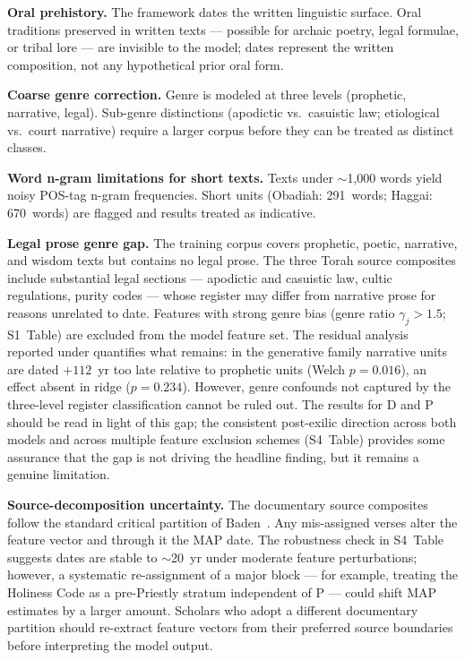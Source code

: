 \documentclass[10pt,letterpaper]{article}
\begin{document}
\textbf{Oral prehistory.}  The framework dates the written linguistic
surface.  Oral traditions preserved in written texts --- possible for
archaic poetry, legal formulae, or tribal lore --- are invisible to the
model; dates represent the written composition, not any hypothetical
prior oral form.

\textbf{Coarse genre correction.}  Genre is modeled at three levels
(prophetic, narrative, legal).  Sub-genre distinctions
(apodictic vs.\ casuistic law; etiological vs.\ court narrative) require
a larger corpus before they can be treated as distinct classes.

\textbf{Word n-gram limitations for short texts.}  Texts under
$\sim$1{,}000 words yield noisy POS-tag n-gram frequencies.  Short units
(Obadiah: 291~words; Haggai: 670~words) are flagged and results treated
as indicative.

\textbf{Legal prose genre gap.}  The training corpus covers prophetic,
poetic, narrative, and wisdom texts but contains no legal prose.  The
three Torah source composites include substantial legal sections ---
apodictic and casuistic law, cultic regulations, purity codes --- whose
register may differ from narrative prose for reasons unrelated to date.
Features with strong genre bias (genre ratio $\gamma_j > 1.5$; S1~Table)
are excluded from the model feature set.  The residual analysis reported
under  quantifies what remains: in the generative
family narrative units are dated $+112$~yr too late relative to prophetic
units (Welch $p = 0.016$), an effect absent in ridge ($p = 0.234$).
However, genre confounds not captured by the three-level register
classification cannot be ruled out.  The results for D and P should be
read in light of this gap; the consistent post-exilic direction across
both models and across multiple feature exclusion schemes (S4~Table)
provides some assurance that the gap is not driving the headline finding,
but it remains a genuine limitation.

\textbf{Source-decomposition uncertainty.}  The documentary source
composites follow the standard critical partition of Baden~\cite{Baden2012}.
Any mis-assigned verses alter the feature vector and through it the MAP
date.  The robustness check in S4~Table suggests dates are stable to
$\sim$20~yr under moderate feature perturbations; however, a systematic
re-assignment of a major block --- for example, treating the Holiness Code
as a pre-Priestly stratum independent of P --- could shift MAP estimates
by a larger amount.  Scholars who adopt a different documentary partition
should re-extract feature vectors from their preferred source boundaries
before interpreting the model output.
\end{document}
